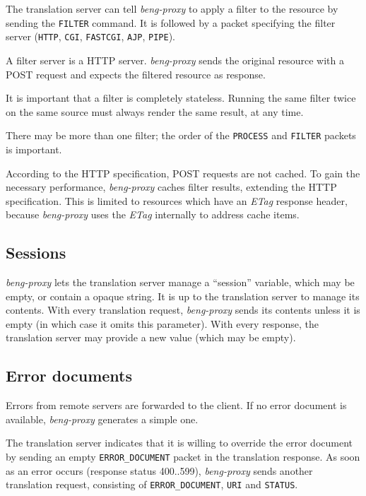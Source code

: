 \documentclass[a4paper,12pt]{article}
\begin{document}
The translation server can tell \emph{beng-proxy} to apply a filter to
the resource by sending the \verb|FILTER| command.  It is followed
by a packet specifying the filter server (\verb|HTTP|,
\verb|CGI|, \verb|FASTCGI|, \verb|AJP|, \verb|PIPE|).

A filter server is a HTTP server.  \emph{beng-proxy} sends the
original resource with a POST request and expects the filtered
resource as response.

It is important that a filter is completely stateless.  Running the
same filter twice on the same source must always render the same
result, at any time.

There may be more than one filter; the order of the \verb|PROCESS|
and \verb|FILTER| packets is important.

According to the HTTP specification, POST requests are not cached.  To
gain the necessary performance, \emph{beng-proxy} caches filter
results, extending the HTTP specification.  This is limited to
resources which have an \emph{ETag} response header, because
\emph{beng-proxy} uses the \emph{ETag} internally to address cache
items.

\subsection{Sessions}
\label{sessions}

\emph{beng-proxy} lets the translation server manage a ``session''
variable, which may be empty, or contain a opaque string.  It is up to
the translation server to manage its contents.  With every translation
request, \emph{beng-proxy} sends its contents unless it is empty (in
which case it omits this parameter).  With every response, the
translation server may provide a new value (which may be empty).

\subsection{Error documents}
\label{errdoc}

Errors from remote servers are forwarded to the client.  If no error
document is available, \emph{beng-proxy} generates a simple one.

The translation server indicates that it is willing to override the
error document by sending an empty \verb|ERROR_DOCUMENT| packet in
the translation response.  As soon as an error occurs (response status
400..599), \emph{beng-proxy} sends another translation request,
consisting of \verb|ERROR_DOCUMENT|, \verb|URI| and
\verb|STATUS|.
\end{document}
